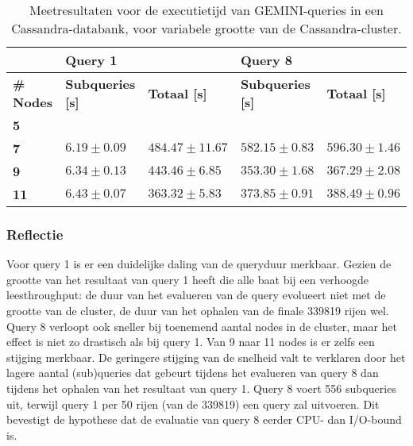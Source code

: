 \begin{table}[!h]
\centering
\begin{tabular}{@{}lllll@{}}
\cmidrule(l){2-5}
                                       & \multicolumn{2}{|l|}{\textbf{Query 1}}                                                      & \multicolumn{2}{l|}{\textbf{Query 8}}                             \\ 
\midrule
\multicolumn{1}{|l|}{\textbf{\# Nodes}}  & \multicolumn{1}{l|}{\textbf{Subqueries [s]}}               & \multicolumn{1}{l|}{\textbf{Totaal [s]}} & \multicolumn{1}{l|}{\textbf{Subqueries [s]}} & \multicolumn{1}{l|}{\textbf{Totaal [s]}} \\ \midrule
\multicolumn{1}{|l|}{\textbf{5}} & \multicolumn{1}{l|}{$ $} & \multicolumn{1}{l|}{$ $}             & \multicolumn{1}{l|}{$ $}          & \multicolumn{1}{l|}{$ $}                        \\
\multicolumn{1}{|l|}{\textbf{7}} & \multicolumn{1}{l|}{$6.19 \pm 0.09$} &\multicolumn{1}{l|}{$484.47 \pm 11.67$}            & \multicolumn{1}{l|}{$582.15 \pm 0.83$}          & \multicolumn{1}{l|}{$596.30 \pm 1.46$}                        \\
\multicolumn{1}{|l|}{\textbf{9}} & \multicolumn{1}{l|}{$6.34 \pm 0.13$} &\multicolumn{1}{l|}{$443.46 \pm 6.85$}            & \multicolumn{1}{l|}{$353.30 \pm 1.68$}           & \multicolumn{1}{l|}{$367.29 \pm 2.08$}                        \\
\multicolumn{1}{|l|}{\textbf{11}} & \multicolumn{1}{l|}{$6.43 \pm 0.07$} &\multicolumn{1}{l|}{$363.32 \pm 5.83$}           & \multicolumn{1}{l|}{$373.85 \pm 0.91$}           & \multicolumn{1}{l|}{$388.49 \pm 0.96$}                        \\
\bottomrule
\end{tabular}
\caption{Meetresultaten voor de executietijd van GEMINI-queries in een Cassandra-databank, voor variabele grootte van de Cassandra-cluster.}
\end{table}

\subsubsection{Reflectie}

Voor query 1 is er een duidelijke daling van de queryduur merkbaar. Gezien de grootte van het resultaat van query 1 heeft die alle baat bij een verhoogde leesthroughput: de duur van het evalueren van de query evolueert niet met de grootte van de cluster, de duur van het ophalen van de finale 339819 rijen wel.\\
Query 8 verloopt ook sneller bij toenemend aantal nodes in de cluster, maar het effect is niet zo drastisch als bij query 1. Van 9 naar 11 nodes is er zelfs een stijging merkbaar. De geringere stijging van de snelheid valt te verklaren door het lagere aantal (sub)queries dat gebeurt tijdens het evalueren van query 8 dan tijdens het ophalen van het resultaat van query 1. Query 8 voert 556 subqueries uit, terwijl query 1 per 50 rijen (van de 339819) een query zal uitvoeren. Dit bevestigt de hypothese dat de evaluatie van query 8 eerder CPU- dan I/O-bound is.

